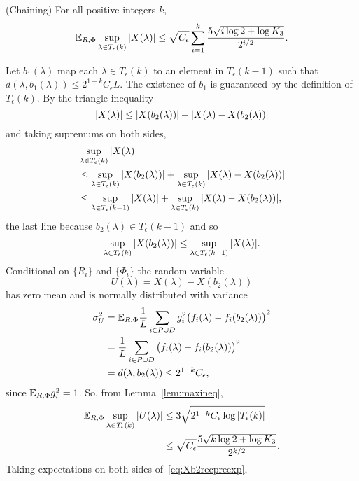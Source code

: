\documentclass[journal]{IEEEtran}
\begin{document}
\begin{lemma}\label{lem:chaining3}(Chaining)
For all positive integers $k$,
\[
{\mathbb E}_{R,\Phi} \sup_{\lambda \in T_\epsilon(k) } {\left\vert  X(\lambda)  \right\vert} \leq \sqrt{C_\epsilon} \sum_{i=1}^k \frac{5\sqrt{i \log 2 + \log K_3}}{2^{i/2}}.
\]
\end{lemma}
\begin{IEEEproof}
Let $b_1(\lambda)$ map each $\lambda \in T_\epsilon(k)$ to an element in $T_\epsilon(k-1)$ such that $d(\lambda, b_1(\lambda)) \leq 2^{1-k}C_\epsilon L$.  The existence of $b_1$ is guaranteed by the definition of $T_\epsilon(k)$.  By the triangle inequality
\[
{\vert X(\lambda) \vert} \leq {\vert X(b_2(\lambda)) \vert} + {\vert X(\lambda) - X(b_2(\lambda)) \vert}  
\]
and taking supremums on both sides,
\begin{align}
&\sup_{\lambda \in T_\epsilon(k)}{\vert X(\lambda) \vert} \nonumber \\
&\leq \sup_{\lambda \in T_\epsilon(k)}{\vert X(b_2(\lambda)) \vert} + \sup_{\lambda \in T_\epsilon(k)} {\vert X(\lambda) - X(b_2(\lambda)) \vert}   \nonumber \\
&\leq \sup_{\lambda \in T_\epsilon(k-1)}{\vert X(\lambda) \vert} + \sup_{\lambda \in T_\epsilon(k)} {\vert X(\lambda) - X(b_2(\lambda)) \vert}, \label{eq:Xb2recpreexp}
\end{align}
the last line because $b_2(\lambda) \in T_\epsilon(k-1)$ and so
\[
\sup_{\lambda \in T_\epsilon(k)}{\vert X(b_2(\lambda)) \vert} \leq \sup_{\lambda \in T_\epsilon(k-1)}{\vert X(\lambda) \vert}.
\]
Conditional on $\{R_i\}$ and $\{\Phi_i\}$ the random variable
\[
U(\lambda) = X(\lambda) - X(b_2(\lambda))
\]
has zero mean and is normally distributed with variance
\begin{align*}
\sigma_U^2 &= {\mathbb E}_{R,\Phi} \frac{1}{L} \sum_{i \in P \cup D} g_i^2 \big( f_i(\lambda) - f_i(b_2(\lambda)) \big)^2 \\
&=  \frac{1}{L} \sum_{i \in P \cup D} \big( f_i(\lambda) - f_i(b_2(\lambda)) \big)^2 \\
&= d(\lambda, b_2(\lambda)) \leq 2^{1-k} C_\epsilon,
\end{align*}
since ${\mathbb E}_{R,\Phi}g_i^2 = 1$.  So, from Lemma~\ref{lem:maxineq},
\begin{align*}
{\mathbb E}_{R,\Phi} \sup_{\lambda \in T_\epsilon(k)} {\vert U(\lambda) \vert} &\leq 3 \sqrt{ 2^{1-k} C_\epsilon \log {\left\vert T_\epsilon(k) \right\vert} } \\
&\leq \sqrt{C_\epsilon} \frac{5\sqrt{k \log 2 + \log K_3}}{2^{k/2}}.
\end{align*}
Taking expectations on both sides of~\eqref{eq:Xb2recpreexp},

\end{IEEEproof}
\end{document}
